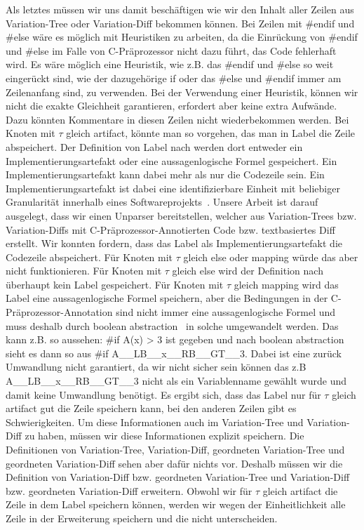 Als letztes müssen wir uns damit beschäftigen wie wir den Inhalt aller Zeilen aus Variation-Tree oder Variation-Diff bekommen können. Bei Zeilen mit \#endif und \#else wäre es möglich mit Heuristiken zu arbeiten, da die Einrückung von \#endif und \#else im Falle von C-Präprozessor nicht dazu führt, das Code fehlerhaft wird. Es wäre möglich eine Heuristik, wie z.B. das \#endif  und \#else so weit eingerückt sind, wie der dazugehörige if oder das \#else und \#endif immer am Zeilenanfang sind, zu verwenden. Bei der Verwendung einer Heuristik, können wir nicht die exakte Gleichheit garantieren, erfordert aber keine extra Aufwände. Dazu könnten Kommentare in diesen Zeilen nicht wiederbekommen werden. Bei Knoten mit $\tau$ gleich artifact, könnte man so vorgehen, das man in Label die Zeile abspeichert. Der Definition von Label nach werden dort entweder ein Implementierungsartefakt oder eine aussagenlogische Formel gespeichert. Ein Implementierungsartefakt kann dabei mehr als nur die Codezeile sein. Ein Implementierungsartefakt ist dabei  eine identifizierbare Einheit mit beliebiger Granularität innerhalb eines Softwareprojekts~\cite{BTS+:ESECFSE22}. Unsere Arbeit ist darauf ausgelegt, dass wir einen Unparser bereitstellen, welcher aus Variation-Trees bzw. Variation-Diffs mit C-Präprozessor-Annotierten Code bzw. textbasiertes Diff erstellt. Wir konnten fordern, dass das Label als Implementierungsartefakt die Codezeile abspeichert. Für Knoten mit $\tau$ gleich else oder mapping würde das aber nicht funktionieren. Für Knoten mit $\tau$ gleich else wird der Definition nach überhaupt kein Label gespeichert. Für Knoten mit $\tau$ gleich mapping wird das Label eine aussagenlogische Formel speichern, aber die Bedingungen in der C-Präprozessor-Annotation sind nicht immer eine aussagenlogische Formel und muss deshalb durch boolean abstraction~\cite{BTS+:ESECFSE22} in solche umgewandelt werden. Das kann z.B. so aussehen: \#if A(x) > 3 ist gegeben und nach boolean abstraction sieht es dann so aus \#if A\_\_LB\_\_x\_\_RB\_\_GT\_\_3. Dabei ist eine zurück Umwandlung nicht garantiert, da wir nicht sicher sein können das z.B  A\_\_LB\_\_x\_\_RB\_\_GT\_\_3 nicht als ein Variablenname gewählt wurde und damit keine Umwandlung benötigt. Es ergibt sich, dass das Label nur für $\tau$ gleich artifact gut die Zeile speichern kann, bei den anderen Zeilen gibt es Schwierigkeiten. Um diese Informationen auch im Variation-Tree und Variation-Diff zu haben, müssen wir diese Informationen explizit speichern. Die Definitionen von Variation-Tree, Variation-Diff, geordneten Variation-Tree und geordneten Variation-Diff sehen aber dafür nichts vor. Deshalb müssen wir die Definition von Variation-Diff bzw. geordneten Variation-Tree und Variation-Diff bzw. geordneten Variation-Diff erweitern. Obwohl wir für $\tau$ gleich artifact die Zeile in dem Label speichern können, werden wir wegen der Einheitlichkeit alle Zeile in der Erweiterung speichern und die nicht unterscheiden.
